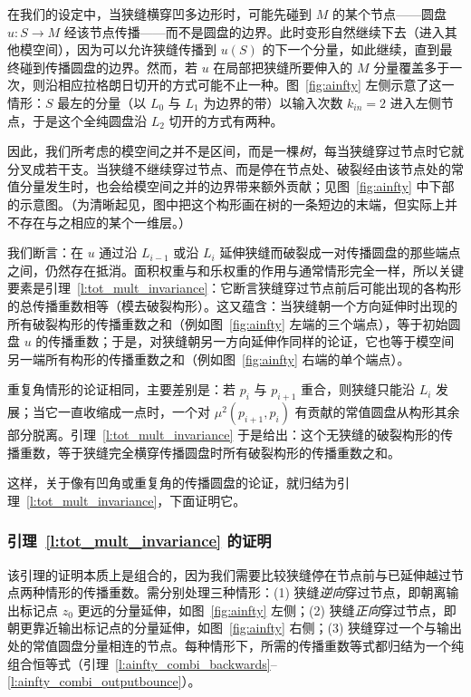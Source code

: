在我们的设定中，当狭缝横穿凹多边形时，可能先碰到 $M$ 的某个节点——圆盘 $u:S\to M$ 经该节点传播——而不是圆盘的边界。此时变形自然继续下去（进入其他模空间），因为可以允许狭缝传播到 $u(S)$ 的下一个分量，如此继续，直到最终碰到传播圆盘的边界。然而，若 $u$ 在局部把狭缝所要伸入的 $M$ 分量覆盖多于一次，则沿相应拉格朗日切开的方式可能不止一种。图~\ref{fig:ainfty} 左侧示意了这一情形：$S$ 最左的分量（以 $L_0$ 与 $L_1$ 为边界的带）以输入次数 $k_{in}=2$ 进入左侧节点，于是这个全纯圆盘沿 $L_2$ 切开的方式有两种。

因此，我们所考虑的模空间之并不是区间，而是一棵\emph{树}，每当狭缝穿过节点时它就分叉成若干支。当狭缝不继续穿过节点、而是停在节点处、破裂经由该节点处的常值分量发生时，也会给模空间之并的边界带来额外贡献；见图~\ref{fig:ainfty} 中下部的示意图。（为清晰起见，图中把这个构形画在树的一条短边的末端，但实际上并不存在与之相应的某个一维层。）

我们断言：在 $u$ 通过沿 $L_{i-1}$ 或沿 $L_i$ 延伸狭缝而破裂成一对传播圆盘的那些端点之间，仍然存在抵消。面积权重与和乐权重的作用与通常情形完全一样，所以关键要素是引理~\ref{l:tot_mult_invariance}：它断言狭缝穿过节点前后可能出现的各构形的总传播重数相等（模去破裂构形）。这又蕴含：当狭缝朝一个方向延伸时出现的所有破裂构形的传播重数之和（例如图~\ref{fig:ainfty} 左端的三个端点），等于初始圆盘 $u$ 的传播重数；于是，对狭缝朝另一方向延伸作同样的论证，它也等于模空间另一端所有构形的传播重数之和（例如图~\ref{fig:ainfty} 右端的单个端点）。

重复角情形的论证相同，主要差别是：若 $p_i$ 与 $p_{i+1}$ 重合，则狭缝只能沿 $L_i$ 发展；当它一直收缩成一点时，一个对 $\mu^2(p_{i+1},p_i)$ 有贡献的常值圆盘从构形其余部分脱离。引理~\ref{l:tot_mult_invariance} 于是给出：这个无狭缝的破裂构形的传播重数，等于狭缝完全横穿传播圆盘时所有破裂构形的传播重数之和。

这样，关于像有凹角或重复角的传播圆盘的论证，就归结为引理~\ref{l:tot_mult_invariance}，下面证明它。

\subsubsection{引理~\ref{l:tot_mult_invariance} 的证明}\label{sss:proof_lemma_tot}

该引理的证明本质上是组合的，因为我们需要比较狭缝停在节点前与已延伸越过节点两种情形的传播重数。需分别处理三种情形：(1) 狭缝\emph{逆向}穿过节点，即朝离输出标记点 $z_0$ 更远的分量延伸，如图~\ref{fig:ainfty} 左侧；(2) 狭缝\emph{正向}穿过节点，即朝更靠近输出标记点的分量延伸，如图~\ref{fig:ainfty} 右侧；(3) 狭缝穿过一个与输出处的常值圆盘分量相连的节点。每种情形下，所需的传播重数等式都归结为一个纯组合恒等式（引理~\ref{l:ainfty_combi_backwards}–\ref{l:ainfty_combi_outputbounce}）。

